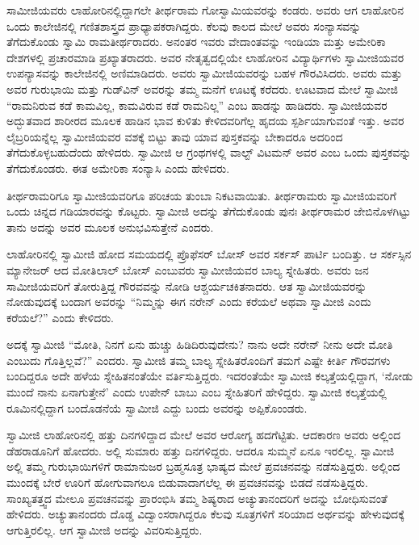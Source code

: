  ಸಾಮೀಜಿಯವರು ಲಾಹೋರಿನಲ್ಲಿದ್ದಾಗಲೇ ತೀರ್ಥರಾಮ ಗೋಸ್ವಾಮಿಯವರನ್ನು ಕಂಡರು. ಅವರು ಆಗ ಲಾಹೋರಿನ ಒಂದು ಕಾಲೇಜಿನಲ್ಲಿ ಗಣಿತಶಾಸ್ತ್ರದ ಪ್ರಾಧ್ಯಾಪಕರಾಗಿದ್ದರು. ಕೆಲವು ಕಾಲದ ಮೇಲೆ ಅವರು ಸಂನ್ಯಾಸವನ್ನು ತೆಗೆದುಕೊಂಡು ಸ್ವಾಮಿ ರಾಮತೀರ್ಥರಾದರು. ಅನಂತರ ಇವರು ವೇದಾಂತವನ್ನು ಇಂಡಿಯಾ ಮತ್ತು ಅಮೇರಿಕಾ ದೇಶಗಳಲ್ಲಿ ಪ್ರಚಾರಮಾಡಿ ಪ್ರಖ್ಯಾತರಾದರು. ಅವರ ನೇತೃತ್ವದಲ್ಲಿಯೇ ಲಾಹೋರಿನ ವಿದ್ಯಾರ್ಥಿಗಳು ಸ್ವಾಮೀಜಿಯವರ ಉಪನ್ಯಾಸವನ್ನು ಕಾಲೇಜಿನಲ್ಲಿ ಅಣಿಮಾಡಿದರು. ಅವರು ಸ್ವಾಮೀಜಿಯವರನ್ನು ಬಹಳ ಗೌರವಿಸಿದರು. ಅವರು ಮತ್ತು ಅವರ ಗುರುಭಾಯಿ ಮತ್ತು ಗುಡ್‍ವಿನ್ ಅವರನ್ನು ತಮ್ಮ ಮನೆಗೆ ಊಟಕ್ಕೆ ಕರೆದರು. ಊಟವಾದ ಮೇಲೆ ಸ್ವಾಮೀಜಿ “ರಾಮನಿರುವ ಕಡೆ ಕಾಮವಿಲ್ಲ, ಕಾಮವಿರುವ ಕಡೆ ರಾಮನಿಲ್ಲ” ಎಂಬ ಹಾಡನ್ನು ಹಾಡಿದರು. ಸ್ವಾಮೀಜಿಯವರ ಅದ್ಭುತವಾದ ಶಾರೀರದ ಮೂಲಕ ಹಾಡಿನ ಭಾವ ಕುಳಿತು ಕೇಳಿದವರಿಗೆಲ್ಲ ಹೃದಯ ಸ್ಪರ್ಶಿಯಾಗುವಂತೆ ಇತ್ತು. ಅವರ ಲೈಬ್ರರಿಯನ್ನೆಲ್ಲ ಸ್ವಾಮೀಜಿಯವರ ವಶಕ್ಕೆ ಬಿಟ್ಟು ತಾವು ಯಾವ ಪುಸ್ತಕವನ್ನು ಬೇಕಾದರೂ ಅದರಿಂದ ತೆಗೆದುಕೊಳ್ಳಬಹುದೆಂದು ಹೇಳಿದರು. ಸ್ವಾಮೀಜಿ ಆ ಗ್ರಂಥಗಳಲ್ಲಿ ವಾಲ್ಟ್ ವಿಟಮನ್ ಅವರ  ಎಂಬ ಒಂದು ಪುಸ್ತಕವನ್ನು ತೆಗೆದುಕೊಂಡರು. ಈತ ಅಮೇರಿಕಾ ಸಂನ್ಯಾಸಿ ಎಂದು ಹೇಳಿದರು. 

 ತೀರ್ಥರಾಮರಿಗೂ ಸ್ವಾಮೀಜಿಯವರಿಗೂ ಪರಿಚಯ ತುಂಬಾ ನಿಕಟವಾಯಿತು. ತೀರ್ಥರಾಮರು ಸ್ವಾಮೀಜಿಯವರಿಗೆ ಒಂದು ಚಿನ್ನದ ಗಡಿಯಾರವನ್ನು ಕೊಟ್ಟರು. ಸ್ವಾಮೀಜಿ ಅದನ್ನು ತೆಗೆದುಕೊಂಡು ಪುನಃ ತೀರ್ಥರಾಮರ ಜೇಬಿನೊಳಗಿಟ್ಟು ತಾನು ಅದನ್ನು ಅವರ ಮೂಲಕ ಅನುಭವಿಸುತ್ತೇನೆ ಎಂದರು. 

 ಲಾಹೋರಿನಲ್ಲಿ ಸ್ವಾಮೀಜಿ ಹೋದ ಸಮಯದಲ್ಲಿ ಪ್ರೊಫೆಸರ್ ಬೋಸ್ ಅವರ ಸರ್ಕಸ್ ಪಾರ್ಟಿ ಬಂದಿತ್ತು. ಆ ಸರ್ಕಸ್ಸಿನ ಮ್ಯಾನೇಜರ್ ಆದ ಮೋತಿಲಾಲ್ ಬೋಸ್ ಎಂಬುವರು ಸ್ವಾಮೀಜಿಯವರ ಬಾಲ್ಯ ಸ್ನೇಹಿತರು. ಅವರು ಜನ ಸಾಮೀಜಿಯವರಿಗೆ ತೋರುತ್ತಿದ್ದ ಗೌರವವನ್ನು ನೋಡಿ ಆಶ್ಚರ್ಯಚಕಿತನಾದರು. ಆತ ಸ್ವಾಮೀಜಿಯವರನ್ನು ನೋಡುವುದಕ್ಕೆ ಬಂದಾಗ ಅವರನ್ನು “ನಿಮ್ಮನ್ನು ಈಗ ನರೇನ್ ಎಂದು ಕರೆಯಲೆ ಅಥವಾ ಸ್ವಾಮೀಜಿ ಎಂದು ಕರೆಯಲೆ?” ಎಂದು ಕೇಳಿದರು. 

 ಅದಕ್ಕೆ ಸ್ವಾಮೀಜಿ “ಮೋತಿ, ನಿನಗೆ ಏನು ಹುಚ್ಚು ಹಿಡಿದಿರುವುದೇನು? ನಾನು ಅದೇ ನರೇನ್ ನೀನು ಅದೇ ಮೋತಿ ಎಂಬುದು ಗೊತ್ತಿಲ್ಲವೆ?” ಎಂದರು. ಸ್ವಾಮೀಜಿ ತಮ್ಮ ಬಾಲ್ಯ ಸ್ನೇಹಿತರೊಂದಿಗೆ ತಮಗೆ ಎಷ್ಟೇ ಕೀರ್ತಿ ಗೌರವಗಳು ಬಂದಿದ್ದರೂ ಅದೇ ಹಳೆಯ ಸ್ನೇಹಿತನಂತೆಯೇ ವರ್ತಿಸುತ್ತಿದ್ದರು. ಇದರಂತೆಯೇ ಸ್ವಾಮೀಜಿ ಕಲ್ಕತ್ತೆಯಲ್ಲಿದ್ದಾಗ, ‘ನೋಡು ಮುಂದೆ ನಾನು ಏನಾಗುತ್ತೇನೆ’ ಎಂದು ಉಪೇನ್ ಬಾಬು ಎಂಬ ಸ್ನೇಹಿತರಿಗೆ ಹೇಳಿದ್ದರು. ಸ್ವಾಮೀಜಿ ಕಲ್ಕತ್ತೆಯಲ್ಲಿ ರೂಮಿನಲ್ಲಿದ್ದಾಗ ಬಂದೊಡನೆಯೆ ಸ್ವಾಮೀಜಿ ಎದ್ದು ಬಂದು ಅವರನ್ನು ಅಪ್ಪಿಕೊಂಂಡರು. 

 ಸ್ವಾಮೀಜಿ ಲಾಹೋರಿನಲ್ಲಿ ಹತ್ತು ದಿನಗಳಿದ್ದಾದ ಮೇಲೆ ಅವರ ಆರೋಗ್ಯ ಹದಗೆಟ್ಟಿತು. ಆದಕಾರಣ ಅವರು ಅಲ್ಲಿಂದ ಡೆಹರಾಡೂನಿಗೆ ಹೋದರು. ಅಲ್ಲಿ ಸುಮಾರು ಹತ್ತು ದಿನಗಳಿದ್ದರು. ಆದರೂ ಸುಮ್ಮನೆ ಏನೂ ಇರಲಿಲ್ಲ. ಸ್ವಾಮೀಜಿ ಅಲ್ಲಿ ತಮ್ಮ ಗುರುಭಾಯಿಗಳಿಗೆ ರಾಮಾನುಜರ ಬ್ರಹ್ಮಸೂತ್ರ ಭಾಷ್ಯದ ಮೇಲೆ ಪ್ರವಚನವನ್ನು ನಡೆಸುತ್ತಿದ್ದರು. ಅಲ್ಲಿಂದ ಮುಂದಕ್ಕೆ ಬೇರೆ ಊರಿಗೆ ಹೋಗುವಾಗಲೂ ಬಿಡುವಾದಾಗಲೆಲ್ಲ ಈ ಪ್ರವಚನವನ್ನು ಬಿಡದೆ ನಡೆಸುತ್ತಿದ್ದರು. ಸಾಂಖ್ಯತತ್ತ್ವದ ಮೇಲೂ ಪ್ರವಚನವನ್ನು ಪ್ರಾರಂಭಿಸಿ ತಮ್ಮ ಶಿಷ್ಯರಾದ ಅಚ್ಯುತಾನಂದರಿಗೆ ಅದನ್ನು ಬೋಧಿಸುವಂತೆ ಹೇಳಿದರು. ಅಚ್ಯುತಾನಂದರು ದೊಡ್ಡ ವಿದ್ವಾಂಸರಾಗಿದ್ದರೂ ಕೆಲವು ಸೂತ್ರಗಳಿಗೆ ಸರಿಯಾದ ಅರ್ಥವನ್ನು ಹೇಳುವುದಕ್ಕೆ ಆಗುತ್ತಿರಲಿಲ್ಲ. ಆಗ ಸ್ವಾಮೀಜಿ ಅದನ್ನು ವಿವರಿಸುತ್ತಿದ್ದರು. 

